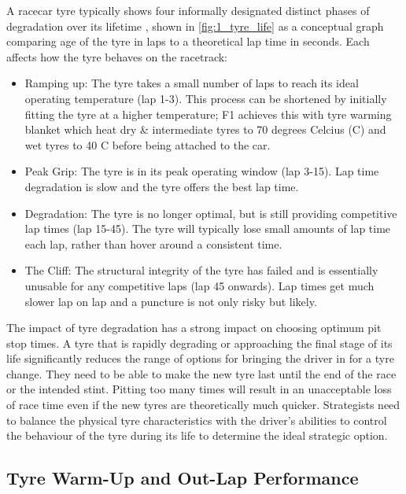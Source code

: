A racecar tyre typically shows four informally designated distinct phases of degradation over its lifetime \cite{Cappello2026TyreDegradation}, shown in \cref{fig:1_tyre_life} as a conceptual graph comparing age of the tyre in laps to a theoretical lap time in seconds. Each affects how the tyre behaves on the racetrack:
\begin{itemize}
    \item Ramping up: The tyre takes a small number of laps to reach its ideal operating temperature (lap 1-3). This process can be shortened by initially fitting the tyre at a higher temperature; F1 achieves this with tyre warming blanket which heat dry \& intermediate tyres to 70 degrees Celcius ({\degree}C) and wet tyres to 40 {\degree}C before being attached to the car.
    \item Peak Grip: The tyre is in its peak operating window (lap 3-15). Lap time degradation is slow and the tyre offers the best lap time. 
    \item Degradation: The tyre is no longer optimal, but is still providing competitive lap times (lap 15-45). The tyre will typically lose small amounts of lap time each lap, rather than hover around a consistent time. 
    \item The Cliff: The structural integrity of the tyre has failed and is essentially unusable for any competitive laps (lap 45 onwards). Lap times get much slower lap on lap and a puncture is not only risky but likely.
\end{itemize}



The impact of tyre degradation has a strong impact on choosing optimum pit stop times. A tyre that is rapidly degrading or approaching the final stage of its life significantly reduces the range of options for bringing the driver in for a tyre change. They need to be able to make the new tyre last until the end of the race or the intended stint. Pitting too many times will result in an unacceptable loss of race time even if the new tyres are theoretically much quicker. Strategists need to balance the physical tyre characteristics with the driver's abilities to control the behaviour of the tyre during its life to determine the ideal strategic option.

\subsection{Tyre Warm-Up and Out-Lap Performance}
\label{subsec:tyre-warmup-background}


